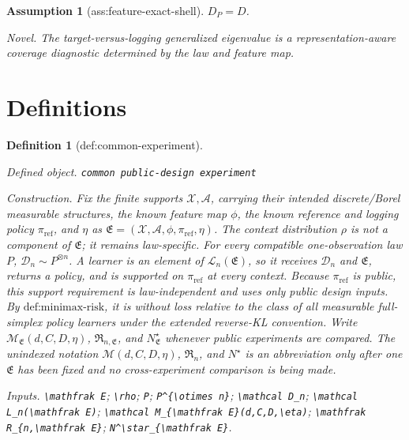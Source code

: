 \documentclass{article}
\newtheorem{assumption}{Assumption}
\newtheorem{definition}{Definition}
\begin{document}
\begin{assumption}[ass:feature-exact-shell]\label{ass:feature-exact-shell}
\(D_P=D\).
\par\smallskip\noindent\emph{Novel.} The target-versus-logging generalized eigenvalue is a representation-aware coverage diagnostic determined by the law and feature map.
\end{assumption}

\section{Definitions}

\begin{definition}[def:common-experiment]\label{def:common-experiment}
\par\smallskip\noindent\emph{Defined object.} \texttt{common public-\allowbreak{}design experiment}
\par\smallskip\noindent\emph{Construction.} Fix the finite supports \(\mathcal X,\mathcal A\), carrying their intended discrete/Borel measurable structures, the known feature map \(\phi\), the known reference and logging policy \(\pi_{\mathrm{ref}}\), and \(\eta\) as \(\mathfrak E=(\mathcal X,\mathcal A,\phi,\pi_{\mathrm{ref}},\eta)\). The context distribution \(\rho\) is not a component of \(\mathfrak E\); it remains law-specific. For every compatible one-observation law \(P\), \(\mathcal D_n\sim P^{\otimes n}\). A learner is an element of \(\mathcal L_n(\mathfrak E)\), so it receives \(\mathcal D_n\) and \(\mathfrak E\), returns a policy, and is supported on \(\pi_{\mathrm{ref}}\) at every context. Because \(\pi_{\mathrm{ref}}\) is public, this support requirement is law-independent and uses only public design inputs. By \(\text{def:minimax-risk}\), it is without loss relative to the class of all measurable full-simplex policy learners under the extended reverse-KL convention. Write \(\mathcal M_{\mathfrak E}(d,C,D,\eta)\), \(\mathfrak R_{n,\mathfrak E}\), and \(N^\star_{\mathfrak E}\) whenever public experiments are compared. The unindexed notation \(\mathcal M(d,C,D,\eta)\), \(\mathfrak R_n\), and \(N^\star\) is an abbreviation only after one \(\mathfrak E\) has been fixed and no cross-experiment comparison is being made.
\par\smallskip\noindent\emph{Inputs.} \texttt{\textbackslash{}\allowbreak{}mathfrak E}; \texttt{\textbackslash{}\allowbreak{}rho}; \texttt{P}; \texttt{P\textasciicircum{}\{\textbackslash{}\allowbreak{}otimes n\}\allowbreak{}}; \texttt{\textbackslash{}\allowbreak{}mathcal D\_\allowbreak{}n}; \texttt{\textbackslash{}\allowbreak{}mathcal L\_\allowbreak{}n(\textbackslash{}\allowbreak{}mathfrak E)}; \texttt{\textbackslash{}\allowbreak{}mathcal M\_\allowbreak{}\{\textbackslash{}\allowbreak{}mathfrak E\}\allowbreak{}(d,\allowbreak{}C,\allowbreak{}D,\allowbreak{}\textbackslash{}\allowbreak{}eta)}; \texttt{\textbackslash{}\allowbreak{}mathfrak R\_\allowbreak{}\{n,\allowbreak{}\textbackslash{}\allowbreak{}mathfrak E\}\allowbreak{}}; \texttt{N\textasciicircum{}\textbackslash{}\allowbreak{}star\_\allowbreak{}\{\textbackslash{}\allowbreak{}mathfrak E\}\allowbreak{}}.
\end{definition}
\end{document}
